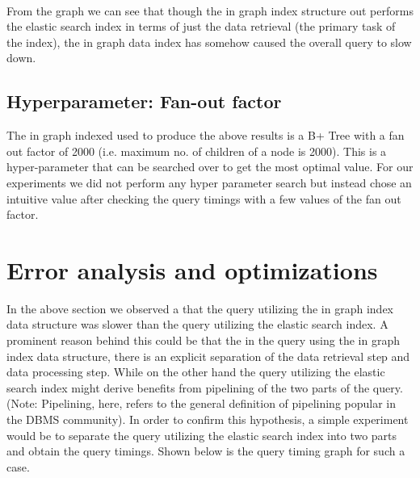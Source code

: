 $\:$\\
From the graph we can see that though the in graph index structure out performs the elastic search index in terms of just the data retrieval (the primary task of the index), the in graph data index has somehow caused the overall query to slow down. 

\subsection{Hyperparameter: Fan-out factor}
The in graph indexed used to produce the above results is a B+ Tree with a fan out factor of 2000 (i.e. maximum no. of children of a node is 2000). This is a hyper-parameter that can be searched over to get the most optimal value. For our experiments we did not perform any hyper parameter search but instead chose an intuitive value after checking the query timings with a few values of the fan out factor. 

\section{Error analysis and optimizations}
In the above section we observed a that the query utilizing the in graph index data structure was slower than the query utilizing the elastic search index. A prominent reason behind this could be that the in the query using the in graph index data structure, there is an explicit separation of the data retrieval step and data processing step. While on the other hand the query utilizing the elastic search index might derive benefits from pipelining of the two parts of the query. (Note: Pipelining, here, refers to the general definition of pipelining popular in the DBMS community). In order to confirm this hypothesis, a simple experiment would be to separate the query utilizing the elastic search index into two parts and obtain the query timings. Shown below is the query timing graph for such a case. 

